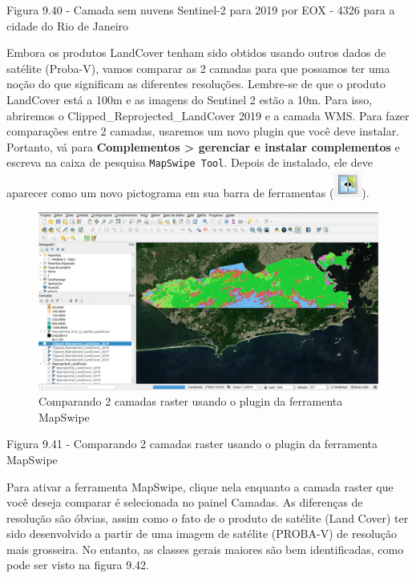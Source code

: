 \documentclass[
]{krantz}
\begin{document}
Figura 9.40 - Camada sem nuvens Sentinel-2 para 2019 por EOX - 4326 para a cidade do Rio de Janeiro

Embora os produtos LandCover tenham sido obtidos usando outros dados de satélite (Proba-V), vamos comparar as 2 camadas para que possamos ter uma noção do que significam as diferentes resoluções. Lembre-se de que o produto LandCover está a 100m e as imagens do Sentinel 2 estão a 10m. Para isso, abriremos o Clipped\_Reprojected\_LandCover 2019 e a camada WMS. Para fazer comparações entre 2 camadas, usaremos um novo plugin que você deve instalar. Portanto, vá para \textbf{Complementos \textgreater{} gerenciar e instalar complementos} e escreva na caixa de pesquisa \texttt{MapSwipe\ Tool}. Depois de instalado, ele deve aparecer como um novo pictograma em sua barra de ferramentas (\includegraphics{media/modulo9/mapswipe-btn.png}).

\begin{figure}
\centering
\includegraphics{media/modulo9/fig941.png}
\caption{Comparando 2 camadas raster usando o plugin da ferramenta MapSwipe}
\end{figure}

Figura 9.41 - Comparando 2 camadas raster usando o plugin da ferramenta MapSwipe

Para ativar a ferramenta MapSwipe, clique nela enquanto a camada raster que você deseja comparar é selecionada no painel Camadas. As diferenças de resolução são óbvias, assim como o fato de o produto de satélite (Land Cover) ter sido desenvolvido a partir de uma imagem de satélite (PROBA-V) de resolução mais grosseira. No entanto, as classes gerais maiores são bem identificadas, como pode ser visto na figura 9.42.
\end{document}
